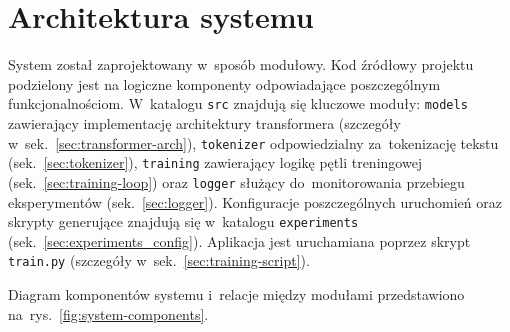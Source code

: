 \documentclass[a4paper,11pt,twoside]{report}
\theoremstyle{definition}
\begin{document}











\chapter{Architektura systemu}\label{sec:system-arch}

System został zaprojektowany w~sposób modułowy. Kod źródłowy projektu podzielony jest na logiczne komponenty odpowiadające poszczególnym funkcjonalnościom. W~katalogu \texttt{src} znajdują się kluczowe moduły: \texttt{models} zawierający implementację architektury transformera (szczegóły w~sek.~\ref{sec:transformer-arch}), \texttt{tokenizer} odpowiedzialny za~tokenizację tekstu (sek.~\ref{sec:tokenizer}), \texttt{training} zawierający logikę pętli treningowej (sek.~\ref{sec:training-loop}) oraz \texttt{logger} służący do~monitorowania przebiegu eksperymentów (sek.~\ref{sec:logger}). Konfiguracje poszczególnych uruchomień oraz skrypty generujące znajdują się w~katalogu \texttt{experiments} (sek.~\ref{sec:experiments_config}). Aplikacja jest uruchamiana poprzez skrypt \texttt{train.py} (szczegóły w~sek.~\ref{sec:training-script}).

Diagram komponentów systemu i~relacje między modułami przedstawiono na~rys.~\ref{fig:system-components}.
\end{document}
